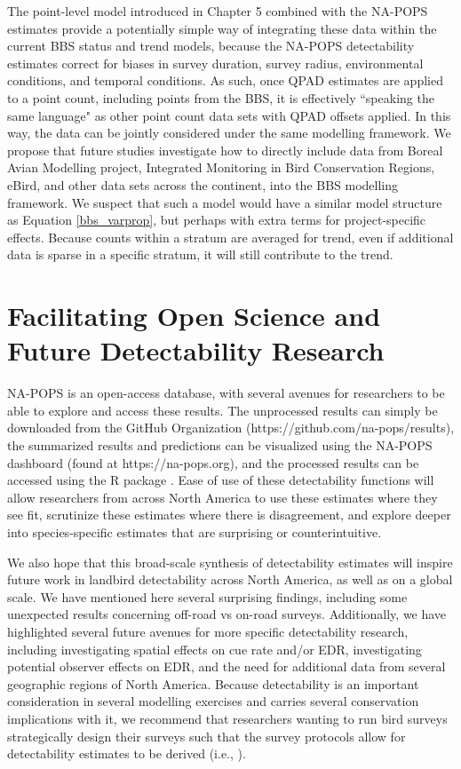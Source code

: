 The point-level model introduced in Chapter 5 combined with the NA-POPS estimates provide a potentially simple way of integrating these data within the current BBS status and trend models, because the NA-POPS detectability estimates correct for biases in survey duration, survey radius, environmental conditions, and temporal conditions.
As such, once QPAD \citep{solymos_calibrating_2013} estimates are applied to a point count, including points from the BBS, it is effectively ``speaking the same language" as other point count data sets with QPAD offsets applied.
In this way, the data can be jointly considered under the same modelling framework.
We propose that future studies investigate how to directly include data from Boreal Avian Modelling project, Integrated Monitoring in Bird Conservation Regions, eBird, and other data sets across the continent, into the BBS modelling framework.
We suspect that such a model would have a similar model structure as Equation \ref{bbs_varprop}, but perhaps with extra terms for project-specific effects.
Because counts within a stratum are averaged for trend, even if additional data is sparse in a specific stratum, it will still contribute to the trend.

\section{Facilitating Open Science and Future Detectability Research}

\par NA-POPS is an open-access database, with several avenues for researchers to be able to explore and access these results. The unprocessed results can simply be downloaded from the GitHub Organization (https://github.com/na-pops/results), the summarized results and predictions can be visualized using the NA-POPS dashboard (found at https://na-pops.org), and the processed results can be accessed using the R package  \citep{edwards_napops_2024}. Ease of use of these detectability functions will allow researchers from across North America to use these estimates where they see fit, scrutinize these estimates where there is disagreement, and explore deeper into species-specific estimates that are surprising or counterintuitive.

\par We also hope that this broad-scale synthesis of detectability estimates will inspire future work in landbird detectability across North America, as well as on a global scale. We have mentioned here several surprising findings, including some unexpected results concerning off-road vs on-road surveys. Additionally, we have highlighted several future avenues for more specific detectability research, including investigating spatial effects on cue rate and/or EDR, investigating potential observer effects on EDR, and the need for additional data from several geographic regions of North America. Because detectability is an important consideration in several modelling exercises and carries several conservation implications with it, we recommend that researchers wanting to run bird surveys strategically design their surveys such that the survey protocols allow for detectability estimates to be derived (i.e., \citet{matsuoka_reviving_2014}). 

